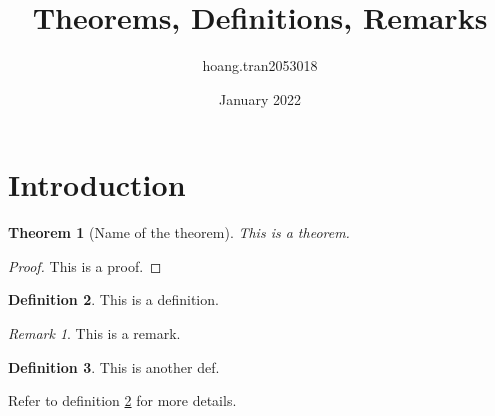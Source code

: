 \documentclass{article}
\title{Theorems, Definitions, Remarks}
\author{hoang.tran2053018 }
\date{January 2022}
\theoremstyle{plain} %
\newtheorem{theorem}{Theorem}[section]
\theoremstyle{definition}
\newtheorem{definition}[theorem]{Definition} %
\theoremstyle{remark}
\newtheorem*{remark}{Remark}
\begin{document}
\maketitle

\section{Introduction}
\begin{theorem}[Name of the theorem]
This is a theorem.
\end{theorem}
\begin{proof}
This is a proof.
\end{proof}
\begin{definition}\label{def:1}
This is a definition.
\end{definition}

\begin{remark}
This is a remark.
\end{remark}

\begin{definition}
This is another def.
\end{definition}

Refer to definition \ref{def:1} for more details.
\end{document}
